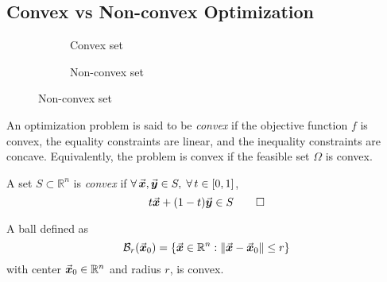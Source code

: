 \subsection{Convex vs Non-convex Optimization}

\begin{figure}[h]
\centering
\begin{subfigure}{0.2\textwidth}
    \centering
    \caption*{Convex set}
\end{subfigure}
\begin{subfigure}{0.2\textwidth}
    \centering
    \caption*{Non-convex set}
\end{subfigure}
\label{fig:convexSet}
\end{figure}


An optimization problem is said to be \emph{convex} if the objective function \(f\) is convex, the equality constraints are linear, and the inequality constraints are concave. Equivalently, the problem is convex if the feasible set \(\Omega\) is convex.

\begin{definition}\label{def:convex_set}
A set \(S\subset\mathbb{R}^{n}\) is \emph{convex} if \(\forall\,\vec{\boldsymbol{x}},\vec{\boldsymbol{y}}\in S,\; \forall\, t\in[0,1]\),
\[
t\vec{\boldsymbol{x}}+(1-t)\vec{\boldsymbol{y}}\in S
\qedhere
\]
\end{definition}

\begin{example}
A ball defined as
\[
\mathcal{B}_{r}(\vec{\boldsymbol{x}}_{0})=\left\{ \vec{\boldsymbol{x}}\in\mathbb{R}^{n} : \|\vec{\boldsymbol{x}}-\vec{\boldsymbol{x}}_{0}\|\leq r \right\}
\]
with center \(\vec{\boldsymbol{x}}_{0}\in\mathbb{R}^{n}\) and radius \(r\), is convex.
\end{example}

